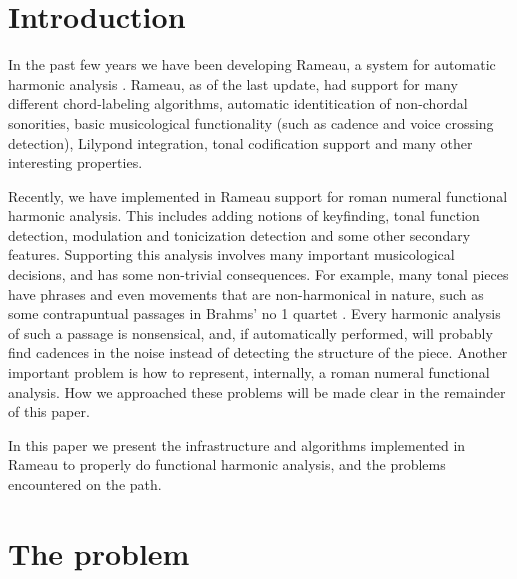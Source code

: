 
\section{Introduction}
\label{sec:introduction}


In the past few years we have been developing Rameau, a system for
automatic harmonic analysis \cite{kroger08:rameau}. Rameau, as of the
last update, had support for many different chord-labeling algorithms,
automatic identitication of non-chordal sonorities, basic
musicological functionality (such as cadence and voice crossing
detection), Lilypond \cite{nienhuys.ea08:lilypond} integration, tonal
codification support and many other interesting properties.


Recently, we have implemented in Rameau support for roman numeral
functional harmonic analysis. This includes adding notions of
keyfinding, tonal function detection, modulation and tonicization
detection and some other secondary features. Supporting this analysis
involves many important musicological decisions, and has some
non-trivial consequences. For example, many tonal pieces have phrases
and even movements that are non-harmonical in nature, such as some
contrapuntual passages in Brahms' no 1 quartet . Every harmonic analysis of such a passage is nonsensical,
and, if automatically performed, will probably find cadences in the
noise instead of detecting the structure of the piece. Another
important problem is how to represent, internally, a roman numeral
functional analysis. How we approached these problems will be made
clear in the remainder of this paper.


\cite{raphael.ea03:harmonic} \cite{maxwell92:expert}
\cite{tsui02:harmonic} \cite{temperley.ea99:modeling}
\cite{taube99:automatic} \cite{winograd68:linguistics}
\cite{barthelemy.ea01:figured} \cite{ulrich77:analysis}


In this paper we present the infrastructure and algorithms implemented
in Rameau to properly do functional harmonic analysis, and the
problems encountered on the path.


\section{The problem}
\label{sec:problem}



